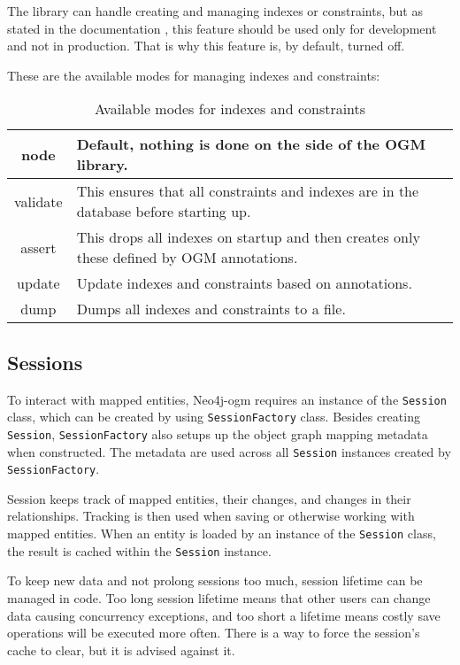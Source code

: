 The library can handle creating and managing indexes or constraints, but as stated in the documentation \cite{neo4j_reference_nodate}, this feature should be used only for development and not in production. That is why this feature is, by default, turned off.

These are the available modes for managing indexes and constraints:
\begin{table}[H]
	\begin{center}
		\begin{tabularx}{\textwidth}{|c|p{}|}
			\hline
			node     & Default, nothing is done on the side of the OGM library.                                  \\
			\hline
			validate & This ensures that all constraints and indexes are in the database before starting up.     \\
			\hline
			assert   & This drops all indexes on startup and then creates only these defined by OGM annotations. \\
			\hline
			update   & Update indexes and constraints based on annotations.                                      \\
			\hline
			dump     & Dumps all indexes and constraints to a file.                                              \\
			\hline
		\end{tabularx}
		\caption{Available modes for indexes and constraints}
	\end{center}
\end{table}

\subsection{Sessions}
To interact with mapped entities, Neo4j-\acrshort{ogm} requires an instance of the \texttt{Session} class, which can be created by using \texttt{SessionFactory} class.
Besides creating \texttt{Session}, \texttt{SessionFactory} also setups up the object graph mapping metadata when constructed.
The metadata are used across all \texttt{Session} instances created by \texttt{SessionFactory}.

Session keeps track of mapped entities, their changes, and changes in their relationships.
Tracking is then used when saving or otherwise working with mapped entities.
When an entity is loaded by an instance of the \texttt{Session} class, the result is cached within the \texttt{Session} instance.

To keep new data and not prolong sessions too much, session lifetime can be managed in code.
Too long session lifetime means that other users can change data causing concurrency exceptions, and too short a lifetime means costly save operations will be executed more often.
There is a way to force the session's cache to clear, but it is advised against it.

